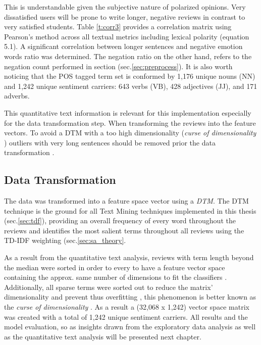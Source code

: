 \documentclass[
	a4paper,
	pdftex,
	12pt,	
	footinclude=true,
	fleqn,
	final,
	]{report}%
\begin{document}
This is understandable given the subjective nature of polarized opinions.
Very dissatisfied users will be prone to write longer, negative
reviews in contrast to very satisfied students. Table \ref{t:corr3} provides 
a correlation matrix using Pearson's method across all textual metrics 
including lexical polarity (equation 5.1). A significant correlation
between longer sentences and negative emotion words ratio was determined.
The negation ratio on the other hand, refers to the negation count \cite{Pang2002} 
performed in section (sec.\ref{sec:preprocess}). It is also worth noticing that the 
POS tagged term set is conformed by 1,176 unique nouns (NN) and 
1,242 unique sentiment carriers: 643 verbs (VB), 428 adjectives (JJ), 
and 171 adverbs. 

This quantitative text information is relevant for this implementation
especially for the data transformation step. When transforming the reviews into the 
feature vectors. To avoid a DTM with a too high dimensionality 
(\emph{curse of dimensionality} \cite{Kamber2006}) outliers with very long 
sentences should be removed prior the data transformation \cite{Pang2002}.

\vspace{-0.45cm}
\subsection{Data Transformation} %
\vspace{-0.3cm}
The data was transformed into a feature space vector using a 
\emph{DTM}. The DTM technique is the ground for all Text Mining techniques 
implemented in this thesis (sec.\ref{sec:tdf}), 
providing an overall frequency of every word throughout the reviews 
and identifies the most salient terms throughout all reviews
using the TD-IDF weighting (sec.\ref{sec:sa_theory}.

As a result from the quantitative text analysis, reviews with term length
beyond the median were sorted in order to every to have a feature vector space
containing the approx. same number of dimensions to fit the classifiers \cite{Fang2015}. 
Additionally, all sparse terms were sorted out to reduce the matrix' dimensionality 
and prevent thus overfitting \cite{Manning2008}, this phenomenon is better known as
the \emph{curse of dimensionality} \cite{Kamber2006}. As a result a (32,068 x 1,242) 
vector space matrix was created with a total of 1,242 unique sentiment carriers. 
All results and the model evaluation, so as insights drawn from the exploratory data analysis
as well as the quantitative text analysis will be presented next chapter.
\end{document}
